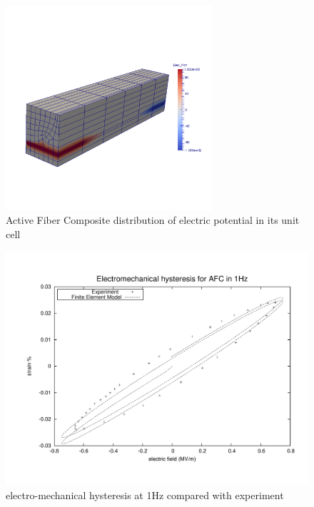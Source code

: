 \begin{figure} 
\centering
\includegraphics[width=3.0in]{./chap_4_structural_analyses/afc_unit_cell/afc_electrip_petential_distribution.pdf}
\caption{Active Fiber Composite distribution of electric potential in its unit cell}
\label{fig:electrip_potential_afc_pictur}  
\end{figure}  

\begin{figure} 
\centering
\includegraphics[width=5.0in]{./chap_4_structural_analyses/afc_unit_cell/comparison/afc_result_electric_field_vs_strain.pdf}
\caption{electro-mechanical hysteresis at 1Hz compared with experiment}
\label{fig:afc_result_electric_field_vs_strain}
\end{figure} 

